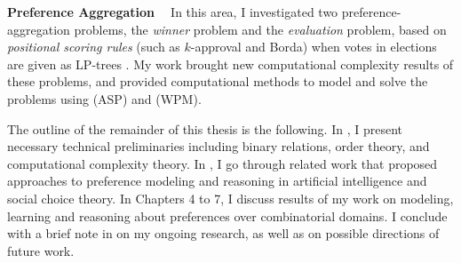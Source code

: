 \smallskip \noindent \textbf{Preference Aggregation  \ }
In this area, I investigated two preference-aggregation 
problems, the \emph{winner} problem and the \emph{evaluation} problem,
based on \textit{positional scoring rules} (such as $k$-approval and Borda) 
when votes in elections are given as LP-trees \cite{abs/ijcai13dc/Liu,conf/adt13/LiuT}. 
My work brought new computational complexity results of these problems, and
provided computational methods to model and solve the problems using
 (ASP) and  (WPM).



The outline of the remainder of this thesis is the following. 
In , I present necessary technical preliminaries
including binary relations, order theory, and computational complexity theory.
In , I go through related work that proposed
approaches to preference modeling and reasoning
in artificial intelligence and social choice theory.
In Chapters 4 to 7, I discuss results of my work on
modeling, learning and reasoning about preferences over combinatorial domains.
I conclude with a brief note in  on my ongoing research,
as well as on possible directions of future work.
